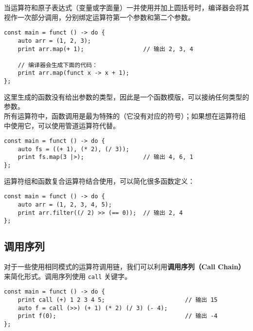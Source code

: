当运算符和原子表达式（变量或字面量）一并使用并加上圆括号时，编译器会将其视作一次部分调用，分别绑定运算符第一个参数和第二个参数。

\begin{minipage}[c]{0.95\textwidth}
\vspace{1.0em}
\begin{lstlisting}
const main = funct () -> do {
    auto arr = (1, 2, 3);
    print arr.map(+ 1);					// 输出 2, 3, 4
    
    // 编译器会生成下面的代码：
    print arr.map(funct x -> x + 1);
};
\end{lstlisting}
\end{minipage}

这里生成的函数没有给出参数的类型，因此是一个函数模版，可以接纳任何类型的参数。 \\

所有运算符中，函数调用是最为特殊的（它没有对应的符号）；如果想在运算符组中使用它，可以使用管道运算符代替。

\begin{minipage}[c]{0.95\textwidth}
\vspace{1.0em}
\begin{lstlisting}
const main = funct () -> do {
    auto fs = ((+ 1), (* 2), (/ 3));
    print fs.map(3 |>);					// 输出 4, 6, 1
};
\end{lstlisting}
\end{minipage}

运算符组和函数复合运算符结合使用，可以简化很多函数定义：

\begin{minipage}[c]{0.95\textwidth}
\vspace{1.0em}
\begin{lstlisting}
const main = funct () -> do {
    auto arr = (1, 2, 3, 4, 5);
    print arr.filter((/ 2) >> (== 0));	// 输出 2, 4
};
\end{lstlisting}
\end{minipage}


\subsection{调用序列}

对于一些使用相同模式的运算符调用链，我们可以利用\textbf{调用序列（Call Chain）}来简化形式。调用序列使用 \lstinline!call! 关键字。

\begin{minipage}[c]{0.95\textwidth}
\vspace{1.0em}
\begin{lstlisting}
const main = funct () -> do {
    print call (+) 1 2 3 4 5;						// 输出 15
    auto f = call (>>) (+ 1) (* 2) (/ 3) (- 4);
    print f(0);										// 输出 -4
};
\end{lstlisting}
\end{minipage}


